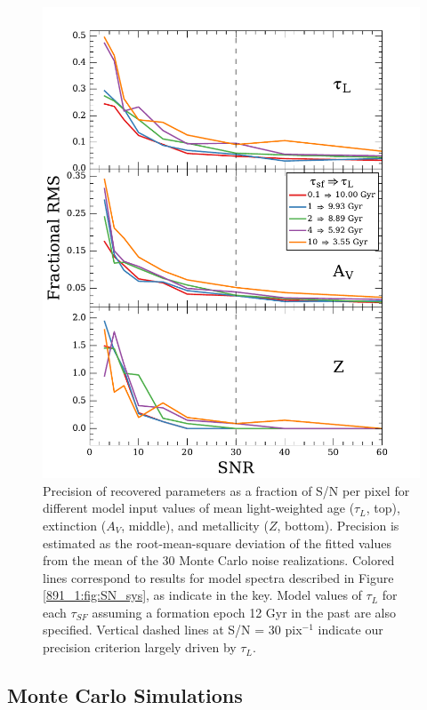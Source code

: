 \begin{figure}
  \centering
  \includegraphics[width=\columnwidth]{891_1/figs/SN_rms.pdf}
  \caption[Precision of derived parameters as a function of
  S/N]{\label{891_1:fig:SN_rms}\fixspacing Precision of recovered parameters
    as a fraction of S/N per pixel for different model input values of
    mean light-weighted age ($\tau_L$, top), extinction ($A_V$,
    middle), and metallicity ($Z$, bottom).  Precision is estimated as
    the root-mean-square deviation of the fitted values from the mean
    of the 30 Monte Carlo noise realizations. Colored lines correspond
    to results for model spectra described in Figure \ref{891_1:fig:SN_sys},
    as indicate in the key. Model values of $\tau_L$ for each
    $\tau_{SF}$ assuming a formation epoch 12 Gyr in the past are also
    specified. Vertical dashed lines at S/N = 30 pix$^{-1}$ indicate
    our precision criterion largely driven by $\tau_L$.}
\end{figure}

\subsection{Monte Carlo Simulations}
\label{891_1:sec:sims}

